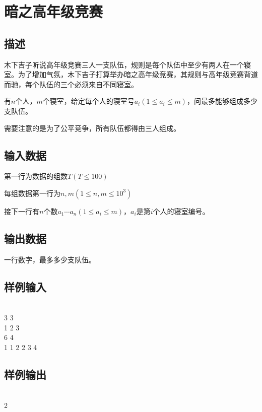 \ifx\allfiles\undefined

\fi


\section{暗之高年级竞赛}
\subsection*{描述}
木下吉子听说高年级竞赛三人一支队伍，规则是每个队伍中至少有两人在一个寝室。为了增加气氛，木下吉子打算举办暗之高年级竞赛，其规则与高年级竞赛背道而驰，每个队伍的三个必须来自不同寝室。

有$n$个人，$m$个寝室，给定每个人的寝室号$a_i(1\leqslant a_i \leqslant m)$，问最多能够组成多少支队伍。

需要注意的是为了公平竞争，所有队伍都得由三人组成。

\subsection*{输入数据}
第一行为数据的组数$T(T\leqslant 100)$

每组数据第一行为$n,m(1\leqslant n,m\leqslant 10^3)$

接下一行有$n$个数$a_1\cdots a_n(1\leqslant a_i\leqslant m)$，$a_i$是第$i$个人的寝室编号。

\subsection*{输出数据}
一行数字，最多多少支队伍。

\subsection*{样例输入}
\\
3 3\\
1 2 3\\
6 4\\
1 1 2 2 3 4

\subsection*{样例输出}
\\
2


\ifx\allfiles\undefined

\fi